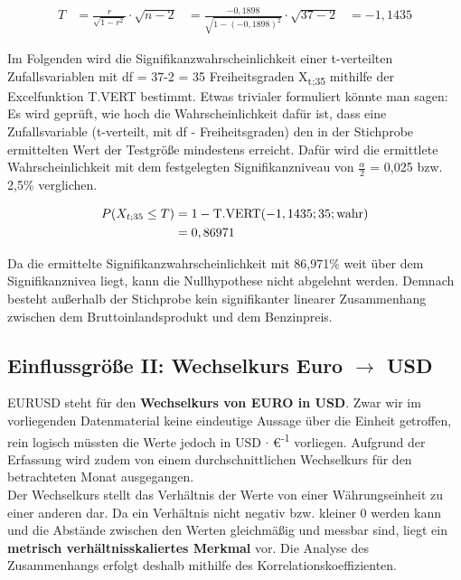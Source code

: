 \begin{align}
  T &= \frac{r}{\sqrt{1-r^2}} \cdot \sqrt{n-2}
    &= \frac{-0,1898}{\sqrt{1-(-0,1898)^2}} \cdot \sqrt{37-2}
    &= -1,1435
\end{align}

Im Folgenden wird die Signifikanzwahrscheinlichkeit einer t-verteilten Zufallsvariablen mit df = 37-2 = 35 Freiheitsgraden X\textsubscript{t;35} mithilfe der Excelfunktion T.VERT bestimmt. Etwas trivialer formuliert könnte man sagen: Es wird geprüft, wie hoch die Wahrscheinlichkeit dafür ist, dass eine Zufallsvariable (t-verteilt, mit df - Freiheitsgraden) den in der Stichprobe ermittelten Wert der Testgröße mindestens erreicht. Dafür wird die ermittlete Wahrscheinlichkeit mit dem festgelegten Signifikanzniveau von $\frac{\alpha}{2}$ = 0,025 bzw. 2,5\% verglichen.

\begin{align}
  P(X_{t;35} \leq T) &= 1 - \text{T.VERT}(-1,1435; 35; \text{wahr})\\
                      &= 0,86971
\end{align}

Da die ermittelte Signifikanzwahrscheinlichkeit mit 86,971\% weit über dem Signifikanznivea liegt, kann die Nullhypothese nicht abgelehnt werden. Demnach besteht außerhalb der Stichprobe kein signifikanter linearer Zusammenhang zwischen dem Bruttoinlandsprodukt und dem Benzinpreis.



\subsection{Einflussgröße II: Wechselkurs Euro $\rightarrow$ USD}
EURUSD steht für den \textbf{Wechselkurs von EURO in USD}. Zwar wir im vorliegenden Datenmaterial keine eindeutige Aussage über die Einheit getroffen, rein logisch müssten die Werte jedoch in USD $\cdot$ €\textsuperscript{-1} vorliegen. Aufgrund der Erfassung wird zudem von einem durchschnittlichen Wechselkurs für den betrachteten Monat ausgegangen.\\
Der Wechselkurs stellt das Verhältnis der Werte von einer Währungseinheit zu einer anderen dar. Da ein Verhältnis nicht negativ bzw. kleiner 0 werden kann und die Abstände zwischen den Werten gleichmäßig und messbar sind, liegt ein \textbf{metrisch verhältnisskaliertes Merkmal} vor. Die Analyse des Zusammenhangs erfolgt deshalb mithilfe des Korrelationskoeffizienten.


